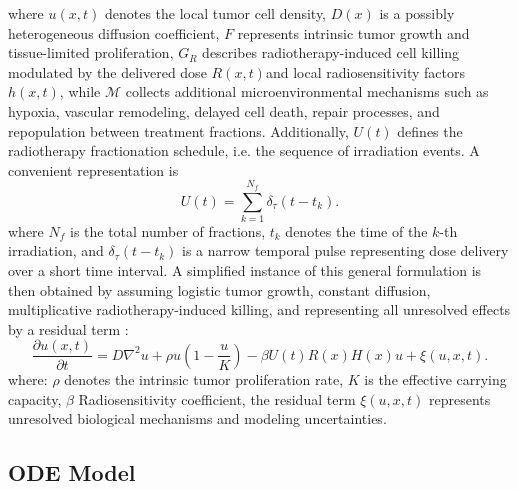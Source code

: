 where \(u(x,t)\) denotes the local tumor cell density, \(D(x)\) is a
possibly heterogeneous diffusion coefficient, \(F\) represents intrinsic
tumor growth and tissue-limited proliferation, \(G_{R}\) describes
radiotherapy-induced cell killing modulated by the delivered dose
\(R(x,t)\)and local radiosensitivity factors \(h(x,t)\), while
\(\mathcal{M}\) collects additional microenvironmental mechanisms such as
hypoxia, vascular remodeling, delayed cell death, repair processes, and
repopulation between treatment fractions. Additionally, \(U(t)\) defines
the radiotherapy fractionation schedule, i.e. the sequence of
irradiation events. A convenient representation is
\begin{equation}
\label{eq:therapy_schedule}
U(t)
=
\sum_{k=1}^{N_f}
\delta_{\tau}(t-t_k).
\end{equation}
where \(N_{f}\) is the total number of fractions, \(t_{k}\) denotes the
time of the \(k\)-th irradiation, and \(\delta_{\tau}(t - t_{k})\) is a
narrow temporal pulse representing dose delivery over a short time
interval. A simplified instance of this general formulation is then obtained by
assuming logistic tumor growth, constant diffusion, multiplicative
radiotherapy-induced killing, and representing all unresolved effects by
a residual term \cite{Sujitha2024ChemoRadiotherapy}:
\begin{equation}
\label{eq:pde_simplified}
\frac{\partial u(x,t)}{\partial t}
=
D\nabla^{2}u
+
\rho u\left(1-\frac{u}{K}\right)
-
\beta U(t)R(x)H(x)u
+
\xi(u,x,t).
\end{equation}
where: \(\rho\) denotes the intrinsic tumor proliferation rate,
\(K\) is the effective carrying capacity,
\(\beta\) Radiosensitivity coefficient, the residual term \(\xi(u,x,t)\) represents unresolved biological
mechanisms and modeling uncertainties.

\subsection{ODE Model}

